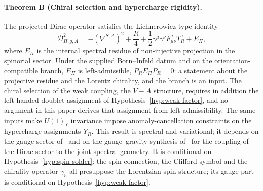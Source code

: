 \documentclass[11pt,a4paper]{article}
\theoremstyle{definition}
\theoremstyle{remark}
\begin{document}
      \paragraph{Theorem B (Chiral selection and hypercharge rigidity).}
        The projected Dirac operator satisfies the Lichnerowicz-type identity
      \begin{equation}
        \label{eq:lichnerowicz}
        \mathcal{D}_{\Pi,g,A}^2
        = -(\nabla^{S,A})^2
        + \frac{R}{4}
        + \frac{1}{2}\gamma^\mu\gamma^\nu F^a_{\mu\nu} T^a_R
        + E_\Pi ,
        \end{equation}
        where $E_\Pi$ is the internal spectral residue of non-injective projection in the
        spinorial sector.
        Under the supplied Born--Infeld datum and on the orientation-compatible branch, $E_\Pi$ is
        left-admissible, $P_R E_\Pi P_R = 0$: a statement about the projective residue and the Lorentz
        chirality, and the branch is an input.
        The chiral selection of the weak coupling, the $V{-}A$ structure, requires in addition the
        left-handed doublet assignment of Hypothesis~\ref{hyp:weak-factor}, and no argument in this
        paper derives that assignment from left-admissibility.
        The same inputs make $U(1)_Y$ invariance impose anomaly-cancellation constraints on the
        hypercharge assignments $Y_R$.
        This result is spectral and variational; it depends on the gauge sector
        of~\cite{Beau2026q6a,Beau2026q12} and on the gauge--gravity synthesis
        of~\cite{Beau2026q13} for the coupling of the Dirac sector to the joint spectral
        geometry.
        It is conditional on Hypothesis~\ref{hyp:spin-solder}: the spin connection, the Clifford
        symbol and the chirality operator $\gamma_5$ all presuppose the Lorentzian spin structure; its
        gauge part is conditional on Hypothesis~\ref{hyp:weak-factor}.
\end{document}
